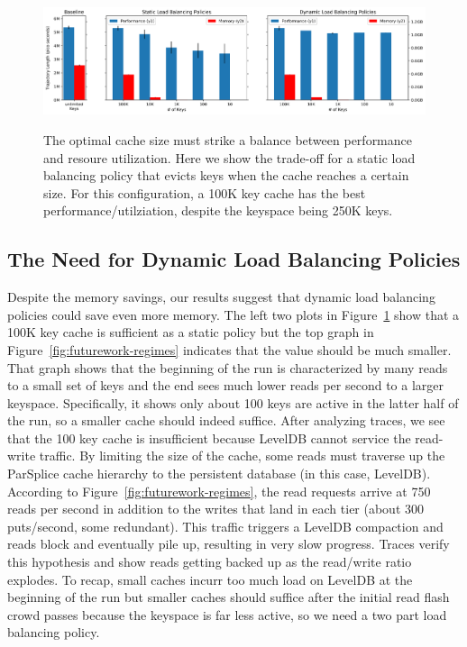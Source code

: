 \begin{figure}[tbh]
  \noindent\includegraphics[width=1\textwidth]{figures/methodology-tradeoff.png}\\
  \caption{The optimal cache size must strike a balance between performance and
  resoure utilization. Here we show the trade-off for a static load balancing
  policy that evicts keys when the cache reaches a certain size. For this
  configuration, a 100K key cache has the best performance/utilziation, despite
  the keyspace being 250K keys. \label{fig:methodology-tradeoff}}
\end{figure}

\subsection{The Need for Dynamic Load Balancing Policies}

Despite the memory savings, our results suggest that dynamic load balancing
policies could save even more memory.  The left two plots in
Figure~\ref{fig:methodology-tradeoff} show that a 100K key cache is sufficient
as a static policy but the top graph in Figure~\ref{fig:futurework-regimes}
indicates that the value should be much smaller. That graph shows that the
beginning of the run is characterized by many reads to a small set of keys and
the end sees much lower reads per second to a larger keyspace. Specifically, it
shows only about 100 keys are active in the latter half of the run, so a
smaller cache should indeed suffice. After analyzing traces, we see that the
100 key cache is insufficient because LevelDB cannot service the read-write
traffic. By limiting the size of the cache, some reads must traverse up the
ParSplice cache hierarchy to the persistent database (in this case, LevelDB).
According to Figure~\ref{fig:futurework-regimes}, the read requests arrive at
750 reads per second in addition to the writes that land in each tier (about
300 puts/second, some redundant). This traffic triggers a LevelDB compaction
and reads block and eventually pile up, resulting in very slow progress. Traces
verify this hypothesis and show reads getting backed up as the read/write ratio
explodes. To recap, small caches incurr too much load on LevelDB at the
beginning of the run but smaller caches should suffice after the initial read
flash crowd passes because the keyspace is far less active, so we need a two
part load balancing policy.

